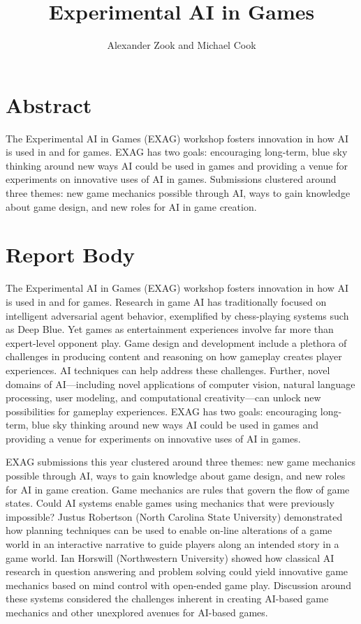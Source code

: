 \documentclass[10pt,a4paper]{article}
\author{Alexander Zook and Michael Cook}
\title{Experimental AI in Games}
\date{}
\begin{document}
\maketitle

\section*{Abstract}
The Experimental AI in Games (EXAG) workshop fosters innovation in how AI is used in and for games.
EXAG has two goals: encouraging long-term, blue sky thinking around new ways AI could be used in games and providing a venue for experiments on innovative uses of AI in games.
Submissions clustered around three themes: new game mechanics possible through AI, ways to gain knowledge about game design, and new roles for AI in game creation.



\section*{Report Body}

The Experimental AI in Games (EXAG) workshop fosters innovation in how AI is used in and for games.
Research in game AI has traditionally focused on intelligent adversarial agent behavior, exemplified by chess-playing systems such as Deep Blue.
Yet games as entertainment experiences involve far more than expert-level opponent play.
Game design and development include a plethora of challenges in producing content and reasoning on how gameplay creates player experiences.
AI techniques can help address these challenges.
Further, novel domains of AI---including novel applications of computer vision, natural language processing, user modeling, and computational creativity---can unlock new possibilities for gameplay experiences.
EXAG has two goals: encouraging long-term, blue sky thinking around new ways AI could be used in games and providing a venue for experiments on innovative uses of AI in games.


EXAG submissions this year clustered around three themes: new game mechanics possible through AI, ways to gain knowledge about game design, and new roles for AI in game creation.
Game mechanics are rules that govern the flow of game states.
Could AI systems enable games using mechanics that were previously impossible?
Justus Robertson (North Carolina State University) demonstrated how planning techniques can be used to enable on-line alterations of a game world in an interactive narrative to guide players along an intended story in a game world.
Ian Horswill (Northwestern University) showed how classical AI research in question answering and problem solving could yield innovative game mechanics based on mind control with open-ended game play.
Discussion around these systems considered the challenges inherent in creating AI-based game mechanics and other unexplored avenues for AI-based games.
\end{document}
